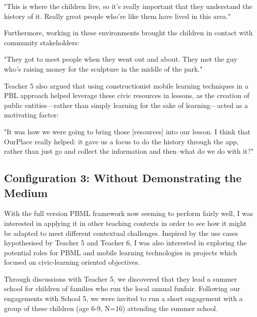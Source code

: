 \begin{displayquote}
"This is where the children live, so it's really important that they understand the history of it. Really great people who're like them have lived in this area."
\end{displayquote}

Furthermore, working in these environments brought the children in contact with community stakeholders: 

\begin{displayquote}
"They got to meet people when they went out and about. They met the guy who's raising money for the sculpture in the middle of the park."
\end{displayquote}

Teacher 5 also argued that using constructionist mobile learning techniques in a PBL approach helped leverage these civic resources in lessons, as the creation of public entities---rather than simply learning for the sake of learning---acted as a motivating factor: 

\begin{displayquote}
"It was how we were going to bring those [resources] into our lesson. I think that OurPlace really helped: it gave us a focus to do the history through the app, rather than just go and collect the information and then--what do we do with it?"
\end{displayquote}

\subsection{Configuration 3: Without Demonstrating the Medium}
With the full version PBML framework now seeming to perform fairly well, I was interested in applying it in other teaching contexts in order to see how it might be adapted to meet different contextual challenges. Inspired by the use cases hypothesised by Teacher 5 and Teacher 6, I was also interested in exploring the potential roles for PBML and mobile learning technologies in projects which focused on civic-learning oriented objectives.

Through discussions with Teacher 5, we discovered that they lead a summer school for children of families who run the local annual funfair. Following our engagements with School 5, we were invited to run a short engagement with a group of these children (age 6-9, N=16) attending the summer school.

